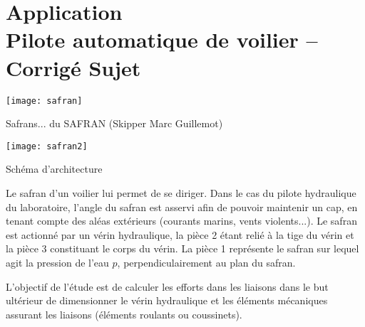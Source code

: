 \chapter*{Application  \\ 
Pilote automatique de voilier -- \ifprof Corrigé \else Sujet \fi}

\iflivret {} \else
\ifprof  {} \else \fi
\fi

\setcounter{question}{0}

\begin{marginfigure}[4cm]
\texttt{[image: safran]}

\caption{Safrans... du SAFRAN (Skipper Marc Guillemot)}
\end{marginfigure}

\begin{marginfigure}[9cm]
\texttt{[image: safran2]}

\caption{Schéma d'architecture}
\end{marginfigure}




Le safran d'un voilier lui permet de se diriger. Dans le cas du pilote hydraulique du laboratoire, l'angle du safran est asservi afin de pouvoir maintenir un cap, en tenant compte des aléas extérieurs (courants marins, vents violents...). Le safran est actionné par un vérin hydraulique, la pièce 2 étant relié à la tige du vérin et la pièce 3 constituant le corps du vérin. La pièce 1 représente le safran sur lequel agit la pression de l'eau $p$, perpendiculairement au plan du safran. 

L'objectif de l'étude est de calculer les efforts dans les liaisons dans le but ultérieur de dimensionner le vérin hydraulique et les éléments mécaniques assurant les liaisons (éléments roulants ou coussinets). 





